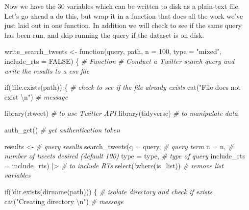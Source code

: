 \documentclass[
  letterpaper,
]{scrbook}
\newenvironment{Shaded}{\begin{snugshade}}{\end{snugshade}}
\newcommand{\AttributeTok}[1]{\textcolor[rgb]{0.00,0.00,0.00}{#1}}
\newcommand{\CommentTok}[1]{\textcolor[rgb]{0.00,0.00,0.00}{\textit{#1}}}
\newcommand{\ConstantTok}[1]{\textcolor[rgb]{0.00,0.00,0.00}{#1}}
\newcommand{\ControlFlowTok}[1]{\textcolor[rgb]{0.00,0.00,0.00}{#1}}
\newcommand{\DecValTok}[1]{\textcolor[rgb]{0.00,0.00,0.00}{#1}}
\newcommand{\FunctionTok}[1]{\textcolor[rgb]{0.00,0.00,0.00}{#1}}
\newcommand{\NormalTok}[1]{\textcolor[rgb]{0.00,0.00,0.00}{#1}}
\newcommand{\OtherTok}[1]{\textcolor[rgb]{0.00,0.00,0.00}{#1}}
\newcommand{\SpecialCharTok}[1]{\textcolor[rgb]{0.00,0.00,0.00}{#1}}
\newcommand{\StringTok}[1]{\textcolor[rgb]{0.00,0.00,0.00}{#1}}
\begin{document}
Now we have the 30 variables which can be written to disk as a
plain-text file. Let's go ahead a do this, but wrap it in a function
that does all the work we've just laid out in one function. In addition
we will check to see if the same query has been run, and skip running
the query if the dataset is on disk.

\begin{Shaded}
\begin{Highlighting}[]
\NormalTok{write\_search\_tweets }\OtherTok{\textless{}{-}} 
  \ControlFlowTok{function}\NormalTok{(query, path, }\AttributeTok{n =} \DecValTok{100}\NormalTok{, }\AttributeTok{type =} \StringTok{"mixed"}\NormalTok{, }\AttributeTok{include\_rts =} \ConstantTok{FALSE}\NormalTok{) \{}
    \CommentTok{\# Function}
    \CommentTok{\# Conduct a Twitter search query and write the results to a csv file}
    
    \ControlFlowTok{if}\NormalTok{(}\SpecialCharTok{!}\FunctionTok{file.exists}\NormalTok{(path)) \{ }\CommentTok{\# check to see if the file already exists}
      \FunctionTok{cat}\NormalTok{(}\StringTok{"File does not exist }\SpecialCharTok{\textbackslash{}n}\StringTok{"}\NormalTok{) }\CommentTok{\# message}
      
      \FunctionTok{library}\NormalTok{(rtweet) }\CommentTok{\# to use Twitter API}
      \FunctionTok{library}\NormalTok{(tidyverse) }\CommentTok{\# to manipulate data}
      
      \FunctionTok{auth\_get}\NormalTok{() }\CommentTok{\# get authentication token}
      
\NormalTok{      results }\OtherTok{\textless{}{-}} \CommentTok{\# query results}
        \FunctionTok{search\_tweets}\NormalTok{(}\AttributeTok{q =}\NormalTok{ query, }\CommentTok{\# query term}
                      \AttributeTok{n =}\NormalTok{ n, }\CommentTok{\# number of tweets desired (default 100)}
                      \AttributeTok{type =}\NormalTok{ type, }\CommentTok{\# type of query}
                      \AttributeTok{include\_rts =}\NormalTok{ include\_rts) }\SpecialCharTok{|\textgreater{}}  \CommentTok{\# to include RTs}
        \FunctionTok{select}\NormalTok{(}\SpecialCharTok{!}\FunctionTok{where}\NormalTok{(is\_list))  }\CommentTok{\# remove list variables}
      
      \ControlFlowTok{if}\NormalTok{(}\SpecialCharTok{!}\FunctionTok{dir.exists}\NormalTok{(}\FunctionTok{dirname}\NormalTok{(path))) \{ }\CommentTok{\# isolate directory and check if exists}
        \FunctionTok{cat}\NormalTok{(}\StringTok{"Creating directory }\SpecialCharTok{\textbackslash{}n}\StringTok{"}\NormalTok{) }\CommentTok{\# message}
        

\end{Highlighting}
\end{Shaded}
\end{document}
